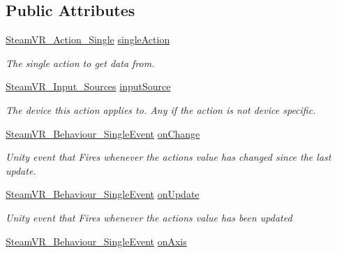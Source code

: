 \subsection*{Public Attributes}
\begin{DoxyCompactItemize}
\item 
\mbox{\hyperlink{class_valve_1_1_v_r_1_1_steam_v_r___action___single}{Steam\+V\+R\+\_\+\+Action\+\_\+\+Single}} \mbox{\hyperlink{class_valve_1_1_v_r_1_1_steam_v_r___behaviour___single_ae14a5f6c6914256256c8961eb8a3cce5}{single\+Action}}
\begin{DoxyCompactList}\small\item\em The single action to get data from. \end{DoxyCompactList}\item 
\mbox{\hyperlink{namespace_valve_1_1_v_r_a82e5bf501cc3aa155444ee3f0662853f}{Steam\+V\+R\+\_\+\+Input\+\_\+\+Sources}} \mbox{\hyperlink{class_valve_1_1_v_r_1_1_steam_v_r___behaviour___single_a1898d51e6409a8995ffbbb2d9cb370ba}{input\+Source}}
\begin{DoxyCompactList}\small\item\em The device this action applies to. Any if the action is not device specific. \end{DoxyCompactList}\item 
\mbox{\hyperlink{class_valve_1_1_v_r_1_1_steam_v_r___behaviour___single_event}{Steam\+V\+R\+\_\+\+Behaviour\+\_\+\+Single\+Event}} \mbox{\hyperlink{class_valve_1_1_v_r_1_1_steam_v_r___behaviour___single_a877767f14603dcc812da6df7aa60a590}{on\+Change}}
\begin{DoxyCompactList}\small\item\em Unity event that Fires whenever the action\textquotesingle{}s value has changed since the last update. \end{DoxyCompactList}\item 
\mbox{\hyperlink{class_valve_1_1_v_r_1_1_steam_v_r___behaviour___single_event}{Steam\+V\+R\+\_\+\+Behaviour\+\_\+\+Single\+Event}} \mbox{\hyperlink{class_valve_1_1_v_r_1_1_steam_v_r___behaviour___single_a673dd50db992d919437c85839ebe0b80}{on\+Update}}
\begin{DoxyCompactList}\small\item\em Unity event that Fires whenever the action\textquotesingle{}s value has been updated \end{DoxyCompactList}\item 
\mbox{\hyperlink{class_valve_1_1_v_r_1_1_steam_v_r___behaviour___single_event}{Steam\+V\+R\+\_\+\+Behaviour\+\_\+\+Single\+Event}} \mbox{\hyperlink{class_valve_1_1_v_r_1_1_steam_v_r___behaviour___single_a38738e6004dda3a00cfadf0978ac868b}{on\+Axis}}

\end{DoxyCompactItemize}
